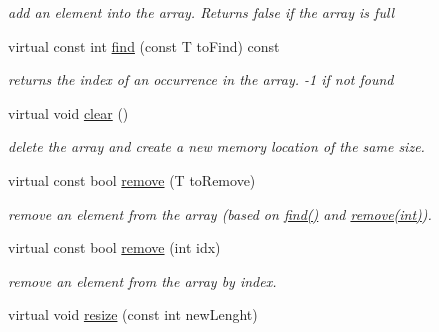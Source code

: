 \begin{DoxyCompactItemize}
\begin{DoxyCompactList}\small\item\em add an element into the array. Returns false if the array is full \end{DoxyCompactList}\item 
\hypertarget{classparray_1_1PointerArray_a436b6664985dbe49c1a70c2ed79573b3}{virtual const int \hyperlink{classparray_1_1PointerArray_a436b6664985dbe49c1a70c2ed79573b3}{find} (const T to\-Find) const }\label{classparray_1_1PointerArray_a436b6664985dbe49c1a70c2ed79573b3}

\begin{DoxyCompactList}\small\item\em returns the index of an occurrence in the array. -\/1 if not found \end{DoxyCompactList}\item 
\hypertarget{classparray_1_1PointerArray_a2c61803a24765673a1f59ba194566946}{virtual void \hyperlink{classparray_1_1PointerArray_a2c61803a24765673a1f59ba194566946}{clear} ()}\label{classparray_1_1PointerArray_a2c61803a24765673a1f59ba194566946}

\begin{DoxyCompactList}\small\item\em delete the array and create a new memory location of the same size. \end{DoxyCompactList}\item 
\hypertarget{classparray_1_1PointerArray_a13ae3b9b2118416351cc63bd456ecf73}{virtual const bool \hyperlink{classparray_1_1PointerArray_a13ae3b9b2118416351cc63bd456ecf73}{remove} (T to\-Remove)}\label{classparray_1_1PointerArray_a13ae3b9b2118416351cc63bd456ecf73}

\begin{DoxyCompactList}\small\item\em remove an element from the array (based on \hyperlink{classparray_1_1PointerArray_a436b6664985dbe49c1a70c2ed79573b3}{find()} and \hyperlink{classparray_1_1PointerArray_a803f8433e144a60f93e61afc7028d423}{remove(int)}). \end{DoxyCompactList}\item 
\hypertarget{classparray_1_1PointerArray_a803f8433e144a60f93e61afc7028d423}{virtual const bool \hyperlink{classparray_1_1PointerArray_a803f8433e144a60f93e61afc7028d423}{remove} (int idx)}\label{classparray_1_1PointerArray_a803f8433e144a60f93e61afc7028d423}

\begin{DoxyCompactList}\small\item\em remove an element from the array by index. \end{DoxyCompactList}\item 
\hypertarget{classparray_1_1PointerArray_a6d4347a899d2783d23775957ad71f743}{virtual void \hyperlink{classparray_1_1PointerArray_a6d4347a899d2783d23775957ad71f743}{resize} (const int new\-Lenght)}\label{classparray_1_1PointerArray_a6d4347a899d2783d23775957ad71f743}


\end{DoxyCompactItemize}
